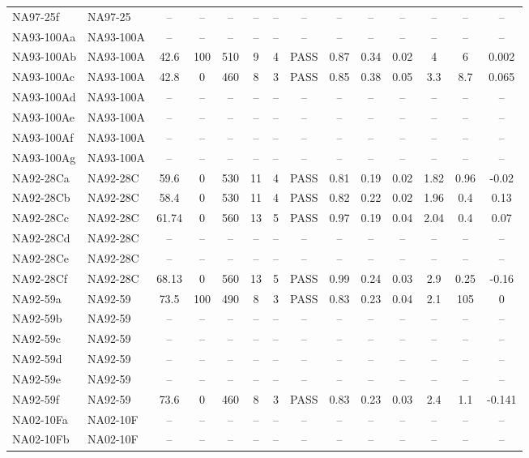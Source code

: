 \documentclass[draft]{agujournal2019}
\begin{document}
\begin{landscape}
\begin{longtable}{llcccccccccccc}
NA97-25f	&	NA97-25	&	–	&	–	&	–	&	–	&	–	&	–	&	–	&	–	&	–	&	–	&	–	&	–	\\
NA93-100Aa	&	NA93-100A	&	–	&	–	&	–	&	–	&	–	&	–	&	–	&	–	&	–	&	–	&	–	&	–	\\
NA93-100Ab	&	NA93-100A	&	42.6	&	100	&	510	&	9	&	4	&	PASS	&	0.87	&	0.34	&	0.02	&	4	&	6	&	0.002	\\
NA93-100Ac	&	NA93-100A	&	42.8	&	0	&	460	&	8	&	3	&	PASS	&	0.85	&	0.38	&	0.05	&	3.3	&	8.7	&	0.065	\\
NA93-100Ad	&	NA93-100A	&	–	&	–	&	–	&	–	&	–	&	–	&	–	&	–	&	–	&	–	&	–	&	–	\\
NA93-100Ae	&	NA93-100A	&	–	&	–	&	–	&	–	&	–	&	–	&	–	&	–	&	–	&	–	&	–	&	–	\\
NA93-100Af	&	NA93-100A	&	–	&	–	&	–	&	–	&	–	&	–	&	–	&	–	&	–	&	–	&	–	&	–	\\
NA93-100Ag	&	NA93-100A	&	–	&	–	&	–	&	–	&	–	&	–	&	–	&	–	&	–	&	–	&	–	&	–	\\
NA92-28Ca	&	NA92-28C	&	59.6	&	0	&	530	&	11	&	4	&	PASS	&	0.81	&	0.19	&	0.02	&	1.82	&	0.96	&	-0.02	\\
NA92-28Cb	&	NA92-28C	&	58.4	&	0	&	530	&	11	&	4	&	PASS	&	0.82	&	0.22	&	0.02	&	1.96	&	0.4	&	0.13	\\
NA92-28Cc	&	NA92-28C	&	61.74	&	0	&	560	&	13	&	5	&	PASS	&	0.97	&	0.19	&	0.04	&	2.04	&	0.4	&	0.07	\\
NA92-28Cd	&	NA92-28C	&	–	&	–	&	–	&	–	&	–	&	–	&	–	&	–	&	–	&	–	&	–	&	–	\\
NA92-28Ce	&	NA92-28C	&	–	&	–	&	–	&	–	&	–	&	–	&	–	&	–	&	–	&	–	&	–	&	–	\\
NA92-28Cf	&	NA92-28C	&	68.13	&	0	&	560	&	13	&	5	&	PASS	&	0.99	&	0.24	&	0.03	&	2.9	&	0.25	&	-0.16	\\
NA92-59a	&	NA92-59	&	73.5	&	100	&	490	&	8	&	3	&	PASS	&	0.83	&	0.23	&	0.04	&	2.1	&	105	&	0	\\
NA92-59b	&	NA92-59	&	–	&	–	&	–	&	–	&	–	&	–	&	–	&	–	&	–	&	–	&	–	&	–	\\
NA92-59c	&	NA92-59	&	–	&	–	&	–	&	–	&	–	&	–	&	–	&	–	&	–	&	–	&	–	&	–	\\
NA92-59d	&	NA92-59	&	–	&	–	&	–	&	–	&	–	&	–	&	–	&	–	&	–	&	–	&	–	&	–	\\
NA92-59e	&	NA92-59	&	–	&	–	&	–	&	–	&	–	&	–	&	–	&	–	&	–	&	–	&	–	&	–	\\
NA92-59f	&	NA92-59	&	73.6	&	0	&	460	&	8	&	3	&	PASS	&	0.83	&	0.23	&	0.03	&	2.4	&	1.1	&	-0.141	\\
NA02-10Fa	&	NA02-10F	&	–	&	–	&	–	&	–	&	–	&	–	&	–	&	–	&	–	&	–	&	–	&	–	\\
NA02-10Fb	&	NA02-10F	&	–	&	–	&	–	&	–	&	–	&	–	&	–	&	–	&	–	&	–	&	–	&	–	\\

\end{longtable}
\end{landscape}
\end{document}
